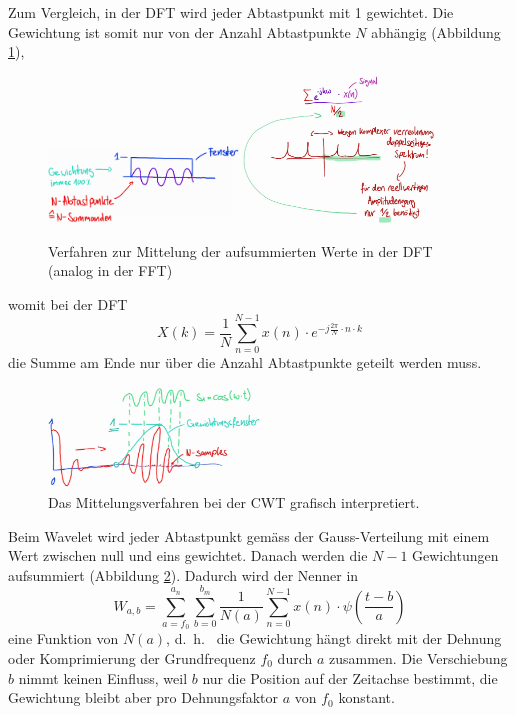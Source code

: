 Zum Vergleich, in der DFT wird jeder Abtastpunkt mit 1 gewichtet. Die Gewichtung ist somit nur von der Anzahl Abtastpunkte $N$ abhängig (Abbildung \ref{wavelet:fig:AmpSklal1u2}),
\begin{figure}
	\centering
	\includegraphics[width=0.45\textwidth]{papers/wavelets/images/11-1_AmpSklal1.png}
	\includegraphics[width=0.45\textwidth]{papers/wavelets/images/11-2_AmpSklal2.png}
	\caption{Verfahren zur Mittelung der aufsummierten Werte in der DFT (analog in der FFT)}
	\label{wavelet:fig:AmpSklal1u2}
\end{figure}
womit bei der DFT \[X(k)=\frac{1}{N}\sum_{n=0}^{N-1}x(n)\cdot e^{-j\frac{2\pi}{N}\cdot n \cdot k}\] die Summe am Ende nur über die Anzahl Abtastpunkte geteilt werden muss.

\begin{figure}
	\centering
	\includegraphics[width=0.5\textwidth]{papers/wavelets/images/11-3_AmpSklal3.png}
	\caption{Das Mittelungsverfahren bei der CWT grafisch interpretiert.}
	\label{wavelet:fig:AmpSklal3}
\end{figure}

Beim Wavelet wird jeder Abtastpunkt gemäss der Gauss-Verteilung mit einem Wert zwischen null und eins gewichtet. Danach werden die $N-1$ Gewichtungen aufsummiert (Abbildung \ref{wavelet:fig:AmpSklal3}). Dadurch wird der Nenner in \[W_{a,b}=\sum_{a=f_0}^{a_n}\sum_{b=0}^{b_m}\frac{1}{N(a)}\sum_{n=0}^{N-1} x(n)\cdot\psi\left(\frac{t-b}{a}\right)\] eine Funktion von $N(a)$, d.~h.~ die Gewichtung hängt direkt mit der Dehnung oder Komprimierung der Grundfrequenz $f_0$ durch $a$ zusammen. Die Verschiebung $b$ nimmt keinen Einfluss, weil $b$ nur die Position auf der Zeitachse bestimmt, die Gewichtung bleibt aber pro Dehnungsfaktor $a$ von $f_0$ konstant.

